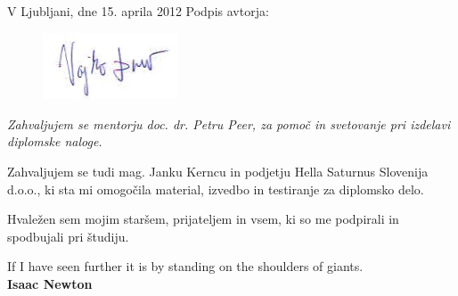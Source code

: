 \documentclass[oneside, a4paper, 12pt]{book}
\newcommand{\clearemptydoublepage}{\newpage{\pagestyle{empty}\cleardoublepage}}
\begin{document}
\vspace{1cm}
\noindent V Ljubljani, dne 15. aprila 2012 \hfill Podpis avtorja:
\begin{figure}[h]
\hfill\includegraphics[keepaspectratio=true,width=4cm]{slike/podpis.JPG}
\end{figure}


\clearemptydoublepage

\thispagestyle{empty}\mbox{}\vfill\null\it%
Zahvaljujem se mentorju doc. dr. Petru Peer, za pomoč in svetovanje pri 
izdelavi diplomske naloge.

Zahvaljujem se tudi mag. Janku Kerncu in podjetju Hella Saturnus 
Slovenija d.o.o., ki sta mi omogočila material, izvedbo in testiranje 
za diplomsko delo.

Hvaležen sem mojim staršem, prijateljem in vsem, ki so me podpirali in 
spodbujali pri študiju.
\rm\normalfont

\clearemptydoublepage

\thispagestyle{empty}\mbox{}{\textheight}\mbox{}\hfill\begin{minipage}{0.90\textwidth}%
\begin{flushright}
If I have seen further it is by standing on the shoulders of giants.\\
\textbf{Isaac Newton}
\end{flushright}
\normalfont\end{minipage}
 
\clearemptydoublepage

\def\thepage{}%
\tableofcontents{}


\clearemptydoublepage

\end{document}
